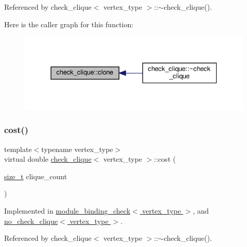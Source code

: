 Referenced by check\+\_\+clique$<$ vertex\+\_\+type $>$\+::$\sim$check\+\_\+clique().

Here is the caller graph for this function\+:
\nopagebreak
\begin{figure}[H]
\begin{center}
\leavevmode
\includegraphics[width=331pt]{d9/d11/structcheck__clique_a2a91d2e947216240ac91ea541fd63182_icgraph}
\end{center}
\end{figure}
\mbox{\label{structcheck__clique_a81f12b024d09699d522ed560c0a96ff6}} 
\subsubsection{\texorpdfstring{cost()}{cost()}}
{\footnotesize\ttfamily template$<$typename vertex\+\_\+type$>$ \\
virtual double \hyperlink{structcheck__clique}{check\+\_\+clique}$<$ vertex\+\_\+type $>$\+::cost (\begin{DoxyParamCaption}\item[{\hyperlink{tutorial__fpt__2017_2intro_2sixth_2test_8c_a7c94ea6f8948649f8d181ae55911eeaf}{size\+\_\+t}}]{clique\+\_\+count }\end{DoxyParamCaption})\hspace{0.3cm}{\ttfamily [pure virtual]}}



Implemented in \hyperlink{structmodule__binding__check_a7ab5b520f8ab3065e15a4726a61995b7}{module\+\_\+binding\+\_\+check$<$ vertex\+\_\+type $>$}, and \hyperlink{structno__check__clique_a9ab6b6c35b470916b74d86e15b2e024c}{no\+\_\+check\+\_\+clique$<$ vertex\+\_\+type $>$}.



Referenced by check\+\_\+clique$<$ vertex\+\_\+type $>$\+::$\sim$check\+\_\+clique().

